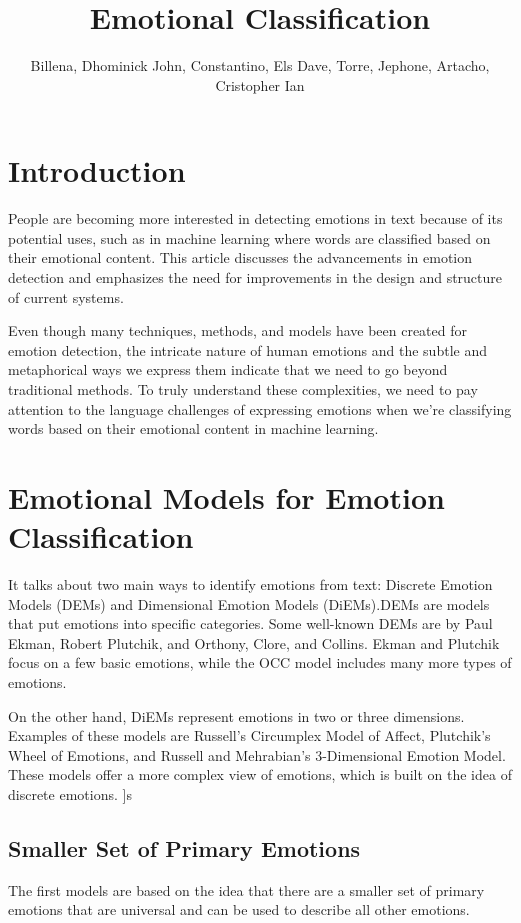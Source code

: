 \documentclass[12pt]{article}
\title{Emotional Classification}
\author{Billena, Dhominick John, Constantino, Els Dave, Torre, Jephone, Artacho, Cristopher Ian}
\begin{document}
    \maketitle
    \section*{Introduction}
    \par People are becoming more interested in detecting emotions in text because of its potential uses, such as in machine learning where words are classified based on their emotional content. This article discusses the advancements in emotion detection and emphasizes the need for improvements in the design and structure of current systems.

    Even though many techniques, methods, and models have been created for emotion detection, the intricate nature of human emotions and the subtle and metaphorical ways we express them indicate that we need to go beyond traditional methods. To truly understand these complexities, we need to pay attention to the language challenges of expressing emotions when we’re classifying words based on their emotional content in machine learning. \cite{emotional_research}
    \section*{Emotional Models for Emotion Classification}
    \par It talks about two main ways to identify emotions from text: Discrete Emotion Models (DEMs) and Dimensional Emotion Models (DiEMs).DEMs are models that put emotions into specific categories. Some well-known DEMs are by Paul Ekman, Robert Plutchik, and Orthony, Clore, and Collins. Ekman and Plutchik focus on a few basic emotions, while the OCC model includes many more types of emotions.
    \par On the other hand, DiEMs represent emotions in two or three dimensions. Examples of these models are Russell’s Circumplex Model of Affect, Plutchik’s Wheel of Emotions, and Russell and Mehrabian’s 3-Dimensional Emotion Model. These models offer a more complex view of emotions, which is built on the idea of discrete emotions. \cite{emotional_research}]s
    \subsection*{Smaller Set of Primary Emotions}
    \par The first models are based on the idea that there are a smaller set of primary emotions that are universal and can be used to describe all other emotions. 
\end{document}
